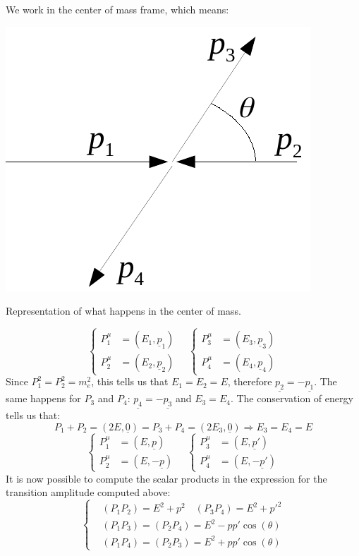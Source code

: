\documentclass[../main.tex]{subfiles}
\begin{document}
We work in the center of mass frame, which means:\begin{marginfigure}
\includegraphics{Images/cdm.pdf}
\caption{Representation of what happens in the center of mass.}
\end{marginfigure}
\[
\left\{
\begin{aligned}
P_1^\mu&=(E_1,\underline{p}_1)\\
P_2^\mu&=(E_2,\underline{p}_2)
\end{aligned}
\right.
\quad
\left\{
\begin{aligned}
P_3^\mu&=(E_3,\underline{p}_3)\\
P_4^\mu&=(E_4,\underline{p}_4)
\end{aligned}
\right.
\]
Since $P_1^2=P_2^2=m_e^2$, this tells us that $E_1=E_2=E$, therefore $\underline{p_2}=-\underline{p_1}$. The same happens for $P_3$ and $P_4$: $\underline{p_4}=-\underline{p_3}$ and $E_3=E_4$. The conservation of energy tells us that:
\[
P_1+P_2=(2E,\underline{0})=P_3+P_4=(2E_3,\underline{0})\Rightarrow E_3=E_4=E
\]
\[
\left\{
\begin{aligned}
P_1^\mu&=(E,\underline{p})\\
P_2^\mu&=(E,-\underline{p})
\end{aligned}
\right.
\quad
\left\{
\begin{aligned}
P_3^\mu&=(E,\underline{p}')\\
P_4^\mu&=(E,-\underline{p}')
\end{aligned}
\right.
\]
It is now possible to compute the scalar products in the expression for the transition amplitude computed above:
\[
\left\{
\begin{aligned}
&(P_1P_2)=E^2+p^2 \quad (P_3P_4)=E^2+p'^2\\
&(P_1P_3)=(P_2P_4)=E^2-pp'\cos(\theta)\\
&(P_1P_4)=(P_2P_3)=E^2+pp'\cos(\theta)
\end{aligned}
\right.
\]
\end{document}
